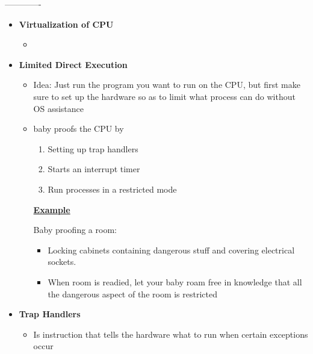 \documentclass[12pt]{article}
\begin{document}
-------------

\begin{itemize}
    \item \textbf{Virtualization of CPU}

    \begin{itemize}
        \item
    \end{itemize}
    \item \textbf{Limited Direct Execution}

    \begin{itemize}
        \item Idea: Just run the program you want to run on the CPU,
        but first make sure to set up the hardware so as to limit what
        process can do without OS assistance
        \item baby proofs the CPU by

        \bigskip

        \begin{enumerate}[1.]
            \item Setting up trap handlers
            \item Starts an interrupt timer
            \item Run processes in a restricted mode
        \end{enumerate}

        \bigskip

        \underline{\textbf{Example}}

        \bigskip

        Baby proofing a room:

        \bigskip

        \begin{itemize}
            \item Locking cabinets containing dangerous stuff and covering electrical sockets.
            \item When room is readied, let your baby roam free in knowledge that all the dangerous
            aspect of the room is restricted
        \end{itemize}
    \end{itemize}

    \item \textbf{Trap Handlers}

    \begin{itemize}
        \item Is instruction that tells the hardware what to run when certain exceptions occur


\end{itemize}
\end{itemize}
\end{document}
